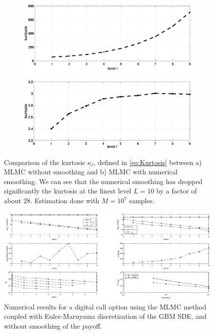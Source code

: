 \begin{figure}[htb]
	\centering %
	\begin{subfigure}{0.5\textwidth}
		\includegraphics[width=\linewidth]{./figures/MLMC_binary_GBM_opt/without_smoothing/digital_option_set1_L_0_2_steps_L_9_N_10_7_kurt}
		\caption{}
		\label{fig:kurt_GBM_digital_non_smoothing_FT}
	\end{subfigure}\hfil %
	\begin{subfigure}{0.5\textwidth}
		\includegraphics[width=\linewidth]{./figures/MLMC_binary_GBM_opt/with_smoothing/digital_option_set1_L_0_2_steps_L_9_N_10_5_kurt}
		\caption{}
		\label{fig:kurt_GBM_digital_smoothing}
	\end{subfigure}\hfil %
	\caption{Comparison of the kurtosis $\kappa_{\ell}$, defined in \eqref{eq:Kurtosis} between a) MLMC without smoothing and b) MLMC with numerical smoothing. We can see that the numerical smoothing has dropped significantly the kurtosis at the finest level $L=10$  by a factor  of about $28$.  Estimation done with $M=10^7$ samples.}
	\label{fig:kurt_GBM_digital}	
\end{figure}
\FloatBarrier

	\begin{figure}[h!]
\centering
\includegraphics[width=1.2\linewidth]{./figures/MLMC_binary_GBM_opt/euler_digital_without_smoothing_L0_2step}

\caption{Numerical results for a digital call option using the MLMC method coupled with Euler-Maruyama discretisation of the GBM SDE, and without smoothing of the payoff.}
\label{fig:euler_digital_without_smoothing}
\end{figure}

